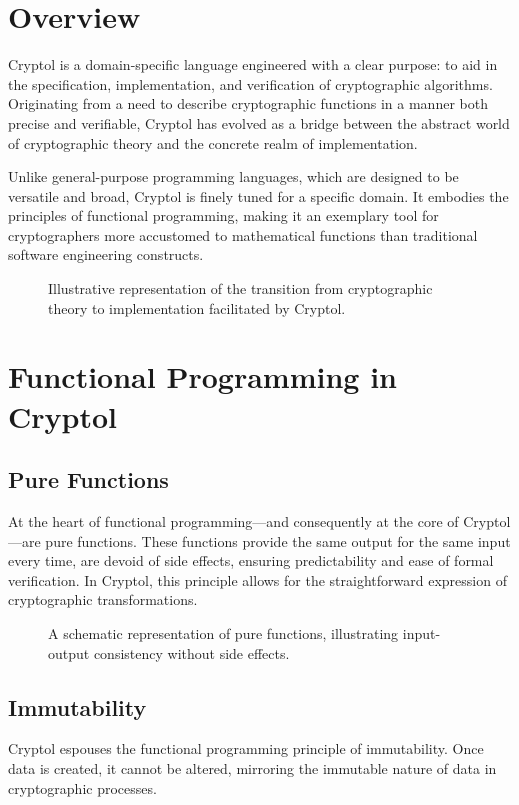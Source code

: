 \documentclass[12pt]{article}
\begin{document}
	
	\section*{Overview}
	Cryptol is a domain-specific language engineered with a clear purpose: to aid in the specification, implementation, and verification of cryptographic algorithms. Originating from a need to describe cryptographic functions in a manner both precise and verifiable, Cryptol has evolved as a bridge between the abstract world of cryptographic theory and the concrete realm of implementation.
	
	Unlike general-purpose programming languages, which are designed to be versatile and broad, Cryptol is finely tuned for a specific domain. It embodies the principles of functional programming, making it an exemplary tool for cryptographers more accustomed to mathematical functions than traditional software engineering constructs.
	
	\begin{figure}[ht]
		\centering
		\caption{Illustrative representation of the transition from cryptographic theory to implementation facilitated by Cryptol.}
		\label{fig:cryptol_overview}
	\end{figure}
	
	\section*{Functional Programming in Cryptol}
	
	\subsection*{Pure Functions}
	At the heart of functional programming—and consequently at the core of Cryptol—are pure functions. These functions provide the same output for the same input every time, are devoid of side effects, ensuring predictability and ease of formal verification. In Cryptol, this principle allows for the straightforward expression of cryptographic transformations.
	
	\begin{figure}[ht]
		\centering
		\caption{A schematic representation of pure functions, illustrating input-output consistency without side effects.}
		\label{fig:pure_functions}
	\end{figure}
	
	\subsection*{Immutability}
	Cryptol espouses the functional programming principle of immutability. Once data is created, it cannot be altered, mirroring the immutable nature of data in cryptographic processes.
	
\end{document}
